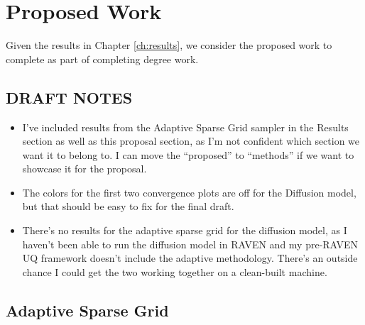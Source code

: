 
\chapter{Proposed Work} %

\label{ch:proposed} %


Given the results in Chapter \ref{ch:results}, we consider the proposed work to complete as part of completing
degree work.

\section{DRAFT NOTES}
\begin{itemize}
  \item I've included results from the Adaptive Sparse Grid sampler in the Results section as well as this proposal
section, as I'm not confident which section we want it to belong to.  I can move the ``proposed'' to
``methods'' if we want to showcase it for the proposal.
  \item The colors for the first two convergence plots are off for the Diffusion model, but that should be
    easy to fix for the final draft.
  \item There's no results for the adaptive sparse grid for the diffusion model, as I haven't been able to run
    the diffusion model in RAVEN and my pre-RAVEN UQ framework doesn't include the adaptive methodology.
    There's an outside chance I could get the two working together on a clean-built machine.
\end{itemize}

\section{Adaptive Sparse Grid}


